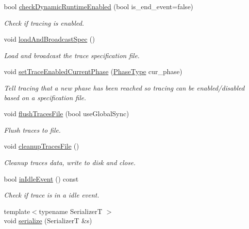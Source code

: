 \begin{DoxyCompactItemize}
bool \hyperlink{structvt_1_1trace_1_1_trace_a995bc2b464af735323a4c07f10b5c55b}{check\+Dynamic\+Runtime\+Enabled} (bool is\+\_\+end\+\_\+event=false)
\begin{DoxyCompactList}\small\item\em Check if tracing is enabled. \end{DoxyCompactList}\item 
void \hyperlink{structvt_1_1trace_1_1_trace_a06f74f8d2c0c2fb97be14a264fd36a45}{load\+And\+Broadcast\+Spec} ()
\begin{DoxyCompactList}\small\item\em Load and broadcast the trace specification file. \end{DoxyCompactList}\item 
void \hyperlink{structvt_1_1trace_1_1_trace_aa2740411eec8e1dabf10d60f48193e69}{set\+Trace\+Enabled\+Current\+Phase} (\hyperlink{namespacevt_a46ce6733d5cdbd735d561b7b4029f6d7}{Phase\+Type} cur\+\_\+phase)
\begin{DoxyCompactList}\small\item\em Tell tracing that a new phase has been reached so tracing can be enabled/disabled based on a specification file. \end{DoxyCompactList}\item 
void \hyperlink{structvt_1_1trace_1_1_trace_a2e07094a48c47b9c591003f0b57305c7}{flush\+Traces\+File} (bool use\+Global\+Sync)
\begin{DoxyCompactList}\small\item\em Flush traces to file. \end{DoxyCompactList}\item 
void \hyperlink{structvt_1_1trace_1_1_trace_ac764c356a7f81abadfe643d618f22b15}{cleanup\+Traces\+File} ()
\begin{DoxyCompactList}\small\item\em Cleanup traces data, write to disk and close. \end{DoxyCompactList}\item 
bool \hyperlink{structvt_1_1trace_1_1_trace_a1e7429d95dbddd9f235a02800d158d36}{in\+Idle\+Event} () const
\begin{DoxyCompactList}\small\item\em Check if trace is in a idle event. \end{DoxyCompactList}\item 
{\footnotesize template$<$typename SerializerT $>$ }\\void \hyperlink{structvt_1_1trace_1_1_trace_a737d62cb21f0b634ca5a45e0221f7ee9}{serialize} (SerializerT \&s)
\end{DoxyCompactItemize}

